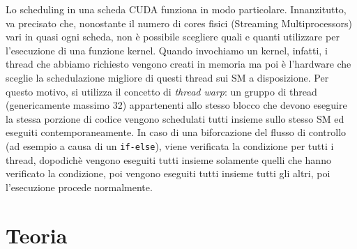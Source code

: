 \documentclass[a4paper]{article}
\begin{document}
	Lo scheduling in una scheda CUDA funziona in modo particolare. Innanzitutto, va precisato che, nonostante il numero di cores fisici (Streaming Multiprocessors) vari in quasi ogni scheda, non è possibile scegliere quali e quanti utilizzare per l'esecuzione di una funzione kernel. Quando invochiamo un kernel, infatti, i thread che abbiamo richiesto vengono creati in memoria ma poi è l'hardware che sceglie la schedulazione migliore di questi thread sui SM a disposizione. Per questo motivo, si utilizza il concetto di \textit{thread warp}: un gruppo di thread (genericamente massimo 32) appartenenti allo stesso blocco che devono eseguire la stessa porzione di codice vengono schedulati tutti insieme sullo stesso SM ed eseguiti contemporaneamente. In caso di una biforcazione del flusso di controllo (ad esempio a causa di un \texttt{if-else}), viene verificata la condizione per tutti i thread, dopodichè vengono eseguiti tutti insieme solamente quelli che hanno verificato la condizione, poi vengono eseguiti tutti insieme tutti gli altri, poi l'esecuzione procede normalmente.
	
	\section{Teoria}
\end{document}
